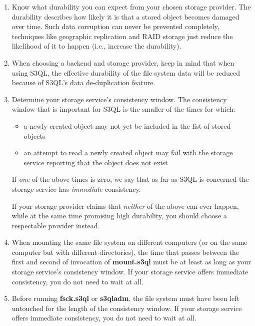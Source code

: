 \documentclass[letterpaper,10pt,english]{sphinxmanual}
\begin{document}
\begin{enumerate}
\item {} 
Know what durability you can expect from your chosen storage
provider. The durability describes how likely it is that a stored
object becomes damaged over time. Such data corruption can never be
prevented completely, techniques like geographic replication and
RAID storage just reduce the likelihood of it to happen (i.e.,
increase the durability).

\item {} 
When choosing a backend and storage provider, keep in mind that
when using S3QL, the effective durability of the file system data
will be reduced because of S3QL's data de-duplication feature.

\item {} 
Determine your storage service's consistency window. The
consistency window that is important for S3QL is the smaller of the
times for which:
\begin{itemize}
\item {} 
a newly created object may not yet be included in the list of
stored objects

\item {} 
an attempt to read a newly created object may fail with the
storage service reporting that the object does not exist

\end{itemize}

If \emph{one} of the above times is zero, we say that as far as S3QL is
concerned the storage service has \emph{immediate} consistency.

If your storage provider claims that \emph{neither} of the above can
ever happen, while at the same time promising high durability, you
should choose a respectable provider instead.

\item {} 
When mounting the same file system on different computers (or on
the same computer but with different  directories),
the time that passes between the first and second of invocation of
\textbf{mount.s3ql} must be at least as long as your storage
service's consistency window. If your storage service offers
immediate consistency, you do not need to wait at all.

\item {} 
Before running \textbf{fsck.s3ql} or \textbf{s3qladm}, the file system
must have been left untouched for the length of the consistency
window. If your storage service offers immediate consistency, you
do not need to wait at all.

\end{enumerate}
\end{document}
